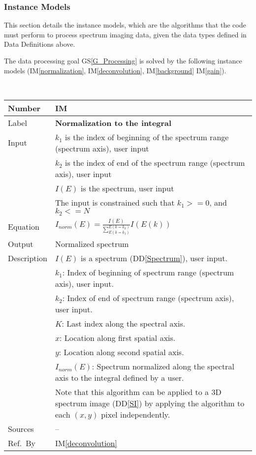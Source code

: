 \documentclass[12pt]{article}
\newcommand{\colAwidth}{0.13\textwidth}
\newcommand{\colBwidth}{0.82\textwidth}
\newcommand{\ddref}[1]{DD\ref{#1}}
\newcommand{\gsref}[1]{GS\ref{#1}}
\newcounter{instnum} %
\newcommand{\iref}[1]{IM\ref{#1}}
\begin{document}
\subsubsection{Instance Models} \label{sec_instance}    

This section details the instance models, which are the algorithms that the code must perform to process spectrum imaging data, given the data types defined in Data Definitions above.

The data processing goal \gsref{G_Processing} is solved by the following instance models (\iref{normalization}, \iref{deconvolution}, \iref{background} \iref{gain}).

~\newline


\noindent
\begin{minipage}{\textwidth}
	\renewcommand*{\arraystretch}{1.5}
	\begin{tabular}{| p{\colAwidth} | p{\colBwidth}|}
		  \hline
		  \rowcolor[gray]{0.9}
		  Number& IM{instnum}\theinstnum \label{normalization}\\
		  \hline
		  Label& \bf Normalization to the integral\\
		  \hline
		  Input& $k_1$  is the index of beginning of the spectrum range (spectrum axis), user input\\
		  & $k_2$ is the index of end of the spectrum range (spectrum axis), user input\\
		  & $I(E)$ is the spectrum, user input\\
		  & The input is constrained such that $k_1 >= 0$, and $k_2 <= N$\\
		  \hline
		  Equation & $I_{norm}(E)=\frac{I(E)}{\sum_{E(k=k_1)}^{E(k=k_2)}} I(E(k))$\\
		  \hline
		  Output & Normalized spectrum\\
		  \hline
		  Description&$I(E)$ is a spectrum (\ddref{Spectrum}), user input.\\
		  &$k_1$: Index of beginning of spectrum range (spectrum axis), user input.\\
		  &$k_2$: Index of end of spectrum range (spectrum axis), user input.\\
		  &$K$: Last index along the spectral axis.\\
		  &$x$: Location along first spatial axis.\\
		  &$y$: Location along second spatial axis.\\
		  &$I_{norm}(E)$: Spectrum normalized along the spectral axis to the integral defined by a user.\\
		  & Note that this algorithm can be applied to a 3D spectrum image (\ddref{SI}) by applying the algorithm to each $(x,y)$ pixel independently.\\
		  \hline
		  Sources & -- \\
		  \hline
		  Ref.\ By & \iref{deconvolution}\\
		  \hline
	\end{tabular}
\end{minipage}\\
\end{document}
